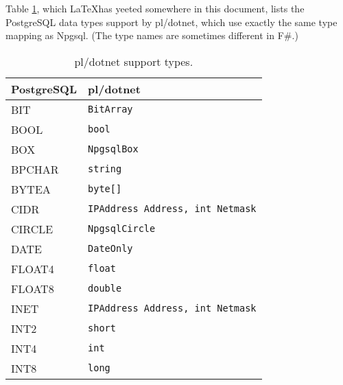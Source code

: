 \documentclass[sigconf,techreport,authorversion,nonacm]{acmart}
\begin{document}
Table \ref{table:pldotnet_support_types}, which \LaTeX has yeeted somewhere
in this document, lists the PostgreSQL data types support by pl/dotnet,
which use exactly the same type mapping as Npgsql. (The type names are
sometimes different in F\#.)

\begin{table}[p]
        \caption{pl/dotnet support types.}
        \label{table:pldotnet_support_types}
        \begin{tabular}{l | l}
                \toprule
                \rowcolor{gray!25} \textbf{PostgreSQL} & \textbf{pl/dotnet}                      \\ \midrule
                BIT                                    & \texttt{BitArray}                       \\
                BOOL                                   & \texttt{bool}                           \\
                BOX                                    & \texttt{NpgsqlBox}                      \\
                BPCHAR                                 & \texttt{string}                         \\
                BYTEA                                  & \texttt{byte[]}                         \\
                CIDR                                   & \texttt{IPAddress Address, int Netmask} \\
                CIRCLE                                 & \texttt{NpgsqlCircle}                   \\
                DATE                                   & \texttt{DateOnly}                       \\
                FLOAT4                                 & \texttt{float}                          \\
                FLOAT8                                 & \texttt{double}                         \\
                INET                                   & \texttt{IPAddress Address, int Netmask} \\
                INT2                                   & \texttt{short}                          \\
                INT4                                   & \texttt{int}                            \\
                INT8                                   & \texttt{long}                           \\

\end{tabular}
\end{table}
\end{document}

